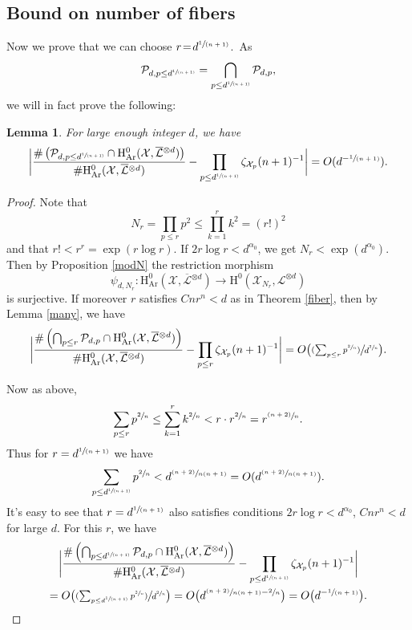 \documentclass[11pt]{article}
\numberwithin{equation}{section}
\newcommand{\psfrac}[2]{\sfrac{(#1)}{#2}}
\newcommand{\spfrac}[2]{\sfrac{#1}{(#2)}}
\theoremstyle{plain}
\newtheorem{lem}[thm]{Lemma}
\theoremstyle{definition}
\newcommand{\ho}{\mathrm{H}}
\newcommand{\X}{\mathcal{X}}
\newcommand{\Li}{\overline{\mathcal{L}}{}}
\newcommand{\li}{\mathcal{L}}
\begin{document}
\subsection{Bound on number of fibers}\mbox{}%
\!Now we prove that we can choose \hbox{$r\!=\!d^{\spfrac{1}{n+1}}$.~As}
\[
\mathcal{P}_{d, p\leq d^{\spfrac{1}{n+1}}}=\bigcap_{p\leq d^{\spfrac{1}{n+1}}}\mathcal{P}_{d,p},
\]
we will in fact prove the following:
\begin{lem}\label{br}
For large enough integer $d$, we have
\[
\biggl| \frac{\#\left(\mathcal{P}_{d, p\leq d^{\spfrac{1}{n+1}}}\cap \ho^0_{\mathrm{Ar}}(\X, \overline{\mathcal{L}}{}^{\otimes d})\right)}{\#\ho^0_{\mathrm{Ar}}(\X, \overline{\mathcal{L}}{}^{\otimes d})} -\prod_{p\leq d^{\spfrac{1}{n+1}}}\zeta_{\X_p}(n+1)^{-1} \biggr|=O(d^{-\spfrac{1}{n+1}}).
\]
\end{lem}
\begin{proof}
Note that
\[
N_r=\prod_{p\leq r}p^2\leq \prod_{k=1}^r k^2=(r!)^2
\]
and that $r!< r^r=\exp(r\log r)$. If $2r\log r<d^{\alpha_0}$, we get $N_r< \exp(d^{\alpha_0})$. Then by Proposition \ref{modN} the restriction morphism
\[
\psi_{d,N_r}: \ho^0_{\mathrm{Ar}}(\X,\Li^{\otimes d}) \to \ho^0(\X_{N_r},\li^{\otimes d})
\]
is surjective. If moreover $r$ satisfies $Cnr^n<d$ as in Theorem \ref{fiber}, then by Lemma \ref{many}, we have
\[
\biggl| \frac{\#\left(\bigcap_{p\leq r}\mathcal{P}_{d,p}\cap \ho^0_{\mathrm{Ar}}(\X, \Li^{\otimes d})\right)}{\#\ho^0_{\mathrm{Ar}}(\X, \Li^{\otimes d})} -\prod_{p\leq r}\zeta_{\X_p}(n+1)^{-1} \biggr| =O\bigl(\psfrac{\textstyle\sum_{p\leq r} p^{\sfrac{2}{n}}}{d^{\sfrac{2}{n}}} \bigr).
\]

Now as above,
\begin{align*}
\sum_{p\leq r}p^{\sfrac{2}{n}} \leq \sum_{k=1}^r k^{\sfrac{2}{n}} < r\cdot r^{\sfrac{2}{n}}= r^{\psfrac{n+2}{n}}.
\end{align*}
Thus for $r=d^{\spfrac{1}{n+1}}$ we have
\[
\sum_{p\leq d^{\spfrac{1}{n+1}}}p^{\sfrac{2}{n}}<d^{\psfrac{n+2}{n(n+1)}}=O(d^{\psfrac{n+2}{n(n+1)}}).
\]
It's easy to see that $r=d^{\spfrac{1}{n+1}}$ also satisfies conditions $2r\log r<d^{\alpha_0}$, $Cnr^n<d$ for large $d$. For this $r$, we have
\begin{multline*}
\biggl| \frac{\#\left(\bigcap_{p\leq d^{\spfrac{1}{n+1}}}\mathcal{P}_{d,p}\cap \ho^0_{\mathrm{Ar}}(\X, \overline{\mathcal{L}}{}^{\otimes d})\right)}{\#\ho^0_{\mathrm{Ar}}(\X, \overline{\mathcal{L}}{}^{\otimes d})} -\prod_{p\leq d^{\spfrac{1}{n+1}}}\zeta_{\X_p}(n+1)^{-1} \biggr|\\
=O\bigl(\psfrac{\textstyle\sum_{p\leq d^{\spfrac{1}{n+1}}}p^{\sfrac{2}{n}}}{d^{\sfrac{2}{n}}} \bigr)
=O\bigl(d^{\psfrac{n+2}{n(n+1)}-\sfrac{2}{n}}\bigr)=O\bigl(d^{-\spfrac{1}{n+1}}\bigr).
\end{multline*}
\end{proof}
\end{document}
